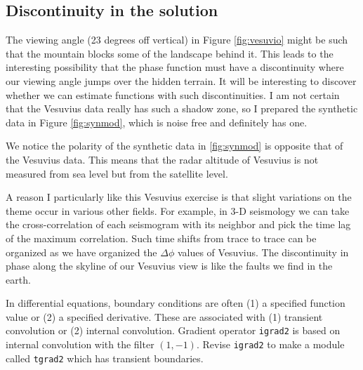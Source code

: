 \subsection{Discontinuity in the solution}
The viewing angle (23 degrees off vertical)
in Figure \ref{fig:vesuvio} might be such
that the mountain blocks some of the landscape behind it.
This leads to the interesting possibility
that the phase function must have a discontinuity
where our viewing angle jumps over the hidden terrain.
It will be interesting to discover whether
we can estimate functions with such discontinuities.
I am not certain that the Vesuvius data
really has such a shadow zone, so I prepared the synthetic
data in Figure \ref{fig:synmod},
which is noise free and definitely has one.
\par
We notice the polarity of the synthetic data in \ref{fig:synmod}
is opposite that of the Vesuvius data. 
This means that the radar altitude of Vesuvius is
not measured from sea level but from the satellite level.

\par
A reason I particularly like this Vesuvius exercise
is that slight variations on the theme occur in various other fields.
For example,
in 3-D seismology
we can take the cross-correlation of each seismogram
with its neighbor and pick the time lag of the maximum correlation.
Such time shifts from trace to trace
can be organized as we have organized the $\Delta\phi$ values of Vesuvius.
The discontinuity in phase along the skyline of our Vesuvius view
is like the faults we find in the earth.

\begin{exer}
\begin{comment}
\item
  
 At iterations determined by
 \texttt{klick()} \vpageref{lst:klick}
 make snapshots 
 {\tt call snap( 'resphz.H', n1,n2, phz)}
 of a residual phase
 {\tt phz(i1,i2) = aimag( clog( zr))}
 of a complex number that you compute by multiplying
 the raw data by the complex conjugate
 of the theoretical data
 {\tt zr = zz(i1,i2) * cexp( cmplx( 0., -hh(i1,i2)))}.
 Examine the movie with
 {\tt <resphz.H Byte | Ta2vplot | Tube}.
 Has the iteration converged?
 Does it look like the correct answer was obtained?  Why or why not?
\end{comment}
\item
In differential equations,
boundary conditions are often (1) a specified function value
or (2) a specified derivative.
These are associated with (1) transient convolution
or (2) internal convolution.
Gradient operator \texttt{igrad2} 
is based on internal convolution with the filter $(1,-1)$.
Revise \texttt{igrad2} to make a module called {\tt tgrad2}
which has transient boundaries.
\end{exer}

